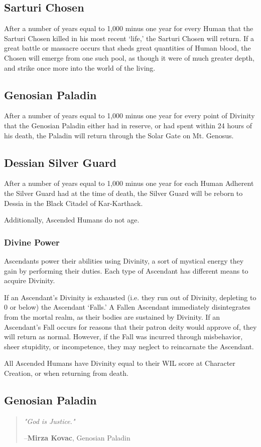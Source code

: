 \documentclass[oneside,11pt,english]{book}
\begin{document}
\subsection*{Sarturi Chosen}
After a number of years equal to 1,000 minus one year for every Human that the Sarturi Chosen killed in 
his most recent ‘life,’ the Sarturi Chosen will return. If a great battle or massacre occurs that sheds great 
quantities of Human blood, the Chosen will emerge from one such pool, as though it were of much 
greater depth, and strike once more into the world of the living. 
\subsection*{Genosian Paladin}
After a number of years equal to 1,000 minus one year for every point of Divinity that the Genosian 
Paladin either had in reserve, or had spent within 24 hours of his death, the Paladin will return through the 
Solar Gate on Mt. Genosus. 
\subsection*{Dessian Silver Guard}
After a number of years equal to 1,000 minus one year for each Human Adherent the Silver Guard had at 
the time of death, the Silver Guard will be reborn to Dessia in the Black Citadel of Kar-Karthack. 
 

Additionally, Ascended Humans do not age. 
\subsubsection{Divine Power}
Ascendants power their abilities using Divinity, a sort of mystical energy they gain by performing their 
duties. Each type of Ascendant has different means to acquire Divinity. 


If an Ascendant's Divinity is exhausted (i.e. they run out of Divinity, depleting to 0 or below) the 
Ascendant ‘Falls.’ A Fallen Ascendant immediately disintegrates from the mortal realm, as their bodies 
are sustained by Divinity. If an Ascendant's Fall occurs for reasons that their patron deity would approve 
of, they will return as normal. However, if the Fall was incurred through misbehavior, sheer stupidity, or 
incompetence, they may neglect to reincarnate the Ascendant. 


All Ascended Humans have Divinity equal to their WIL score at Character Creation, or when returning from death. 
\subsection{Genosian Paladin} 
\begin{quote}
\emph{"God is Justice."}

\hfill--\textbf{Mirza Kovac}, Genosian Paladin 
\end{quote}
\end{document}
